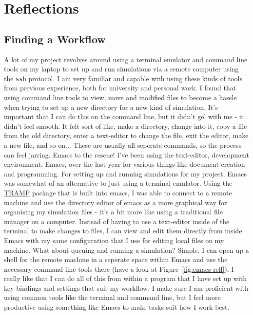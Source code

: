 \documentclass[11pt]{article}
\begin{document}
\section{Reflections}

\subsection{Finding a Workflow}

A lot of my project revolves around using a terminal emulator and command line tools on my laptop to set up and run simulations via a remote computer using the \texttt{ssh} protocol. I am very familiar and capable with using these kinds of tools from previous experience, both for university and personal work. I found that using command line tools to view, move and modified files to become a hassle when trying to set up a new directory for a new kind of simulation. It's important that I can do this on the command line, but it didn't gel with me - it didn't feel smooth. It felt sort of like, make a directory, change into it, copy a file from the old directory, enter a text-editor to change the file, exit the editor, make a new file, and so on... These are usually all seperate commands, so the process can feel jarring. Emacs to the rescue! I've been using the text-editor, development environment, Emacs, over the last year for various things like document creation and programming. For setting up and running simulations for my project, Emacs was somewhat of an alternative to just using a terminal emulator. Using the \href{https://www.emacswiki.org/emacs/TrampMode}{TRAMP} package that is built into emacs, I was able to connect to a remote machine and use the directory editor of emacs as a more graphical way for organising my simulation files - it's a bit more like using a traditional file manager on a computer. Instead of having to use a text-editor inside of the terminal to make changes to files, I can view and edit them directly from inside Emacs with my same configuration that I use for editing local files on my machine. What about queuing and running a simulation? Simple. I can open up a shell for the remote machine in a seperate space within Emacs and use the necessary command line tools there (have a look at Figure~\ref{fig:emacs-refl}). I really like that I can do all of this from within a program that I have set up with key-bindings and settings that suit my workflow. I make sure I am proficient with using common tools like the terminal and command line, but I feel more productive using something like Emacs to make tasks suit how I work best.
\end{document}
